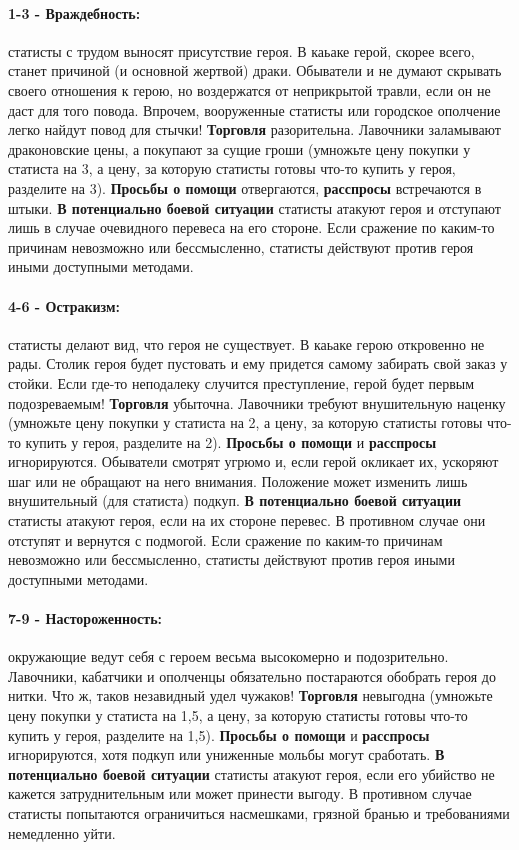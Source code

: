 \paragraph{1-3 - Враждебность:} статисты с трудом выносят присутствие героя. В каьаке герой, скорее всего, станет причиной (и основной жертвой) драки. Обыватели и не думают скрывать своего отношения к герою, но воздержатся от неприкрытой травли, если он не даст для того повода. Впрочем, вооруженные статисты или городское ополчение легко найдут повод для стычки!
\newline
\textbf{Торговля} разорительна. Лавочники заламывают драконовские цены, а покупают за сущие гроши (умножьте цену покупки у статиста на 3, а цену, за которую статисты готовы что-то купить у героя, разделите на 3).
\newline
\textbf{Просьбы о помощи} отвергаются, \textbf{расспросы} встречаются в штыки.
\newline
\textbf{В потенциально боевой ситуации} статисты атакуют героя и отступают лишь в случае очевидного перевеса на его стороне. Если сражение по каким-то причинам невозможно или бессмысленно, статисты действуют против героя иными доступными методами.
\paragraph{4-6 - Остракизм:} статисты делают вид, что героя не существует. В каьаке герою откровенно не рады. Столик героя будет пустовать и ему придется самому забирать свой заказ у стойки. Если где-то неподалеку случится преступление, герой будет первым подозреваемым!
\newline
\textbf{Торговля} убыточна. Лавочники требуют внушительную наценку (умножьте цену покупки у статиста на 2, а цену, за которую статисты готовы что-то купить у героя, разделите на 2).
\newline
\textbf{Просьбы о помощи} и \textbf{расспросы} игнорируются. Обыватели смотрят угрюмо и, если герой окликает их, ускоряют шаг или не обращают на него внимания. Положение может изменить лишь внушительный (для статиста) подкуп.
\newline
\textbf{В потенциально боевой ситуации} статисты атакуют героя, если на их стороне перевес. В противном случае они отступят и вернутся с подмогой. Если сражение по каким-то причинам невозможно или бессмысленно, статисты действуют против героя иными доступными методами.
\paragraph{7-9 - Настороженность:} окружающие ведут себя с героем весьма высокомерно и подозрительно. Лавочники, кабатчики и ополченцы обязательно постараются обобрать героя до нитки. Что ж, таков незавидный удел чужаков!
\textbf{Торговля} невыгодна (умножьте цену покупки у статиста на 1,5, а цену, за которую статисты готовы что-то купить у героя, разделите на 1,5).
\textbf{Просьбы о помощи} и \textbf{расспросы} игнорируются, хотя подкуп или униженные мольбы могут сработать.
\textbf{В потенциально боевой ситуации} статисты атакуют героя, если его убийство не кажется затруднительным или может принести выгоду. В противном случае статисты попытаются ограничиться насмешками, грязной бранью и требованиями немедленно уйти.
